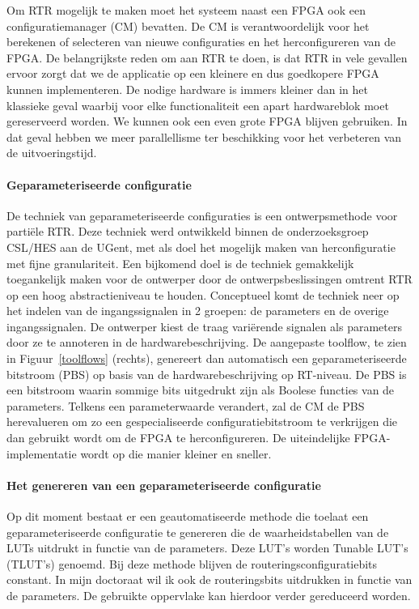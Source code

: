 \documentclass[a4paper,oneside,12pt]{article}
\begin{document}
Om RTR mogelijk te maken moet het systeem naast een FPGA ook een configuratiemanager (CM) bevatten. De CM is verantwoordelijk voor het berekenen of selecteren van nieuwe configuraties en het herconfigureren van de FPGA. De belangrijkste reden om aan RTR te doen, is dat RTR in vele gevallen ervoor zorgt dat we de applicatie op een kleinere en dus goedkopere FPGA kunnen implementeren. De nodige hardware is immers kleiner dan in het klassieke geval waarbij voor elke functionaliteit een apart hardwareblok moet gereserveerd worden. We kunnen ook een even grote FPGA blijven gebruiken. In dat geval hebben we meer parallellisme ter beschikking voor het verbeteren van de uitvoeringstijd.

\paragraph{Geparameteriseerde configuratie}
De techniek van geparameteriseerde configuraties is een ontwerpsmethode voor parti\"ele RTR. Deze techniek werd ontwikkeld binnen de onderzoeksgroep CSL/HES aan de UGent, met als doel het mogelijk maken van herconfiguratie met fijne granulariteit. Een bijkomend doel  is de techniek gemakkelijk toegankelijk maken voor de ontwerper door de ontwerpsbeslissingen omtrent RTR op een hoog abstractieniveau te houden. Conceptueel komt de techniek neer op het indelen van de ingangssignalen in 2 groepen: de parameters en de overige ingangssignalen. De ontwerper kiest de traag vari\"erende signalen als parameters door ze te annoteren in de hardwarebeschrijving. De aangepaste toolflow, te zien in Figuur~\ref{toolflows} (rechts), genereert dan automatisch een geparameteriseerde bitstroom (PBS) op basis van de hardwarebeschrijving op RT-niveau. De PBS is een bitstroom waarin sommige bits uitgedrukt zijn als Boolese functies van de parameters. Telkens een parameterwaarde verandert, zal de CM de PBS herevalueren om zo een gespecialiseerde configuratiebitstroom te verkrijgen die dan gebruikt wordt om de FPGA te herconfigureren. De uiteindelijke FPGA-implementatie wordt op die manier kleiner en sneller.

\paragraph{Het genereren van een geparameteriseerde configuratie}

Op dit moment bestaat er een geautomatiseerde methode die toelaat een geparameteriseerde configuratie te genereren die de waarheidstabellen van de LUTs uitdrukt in functie van de parameters. Deze LUT's worden Tunable LUT's (TLUT's) genoemd. Bij deze methode blijven de routeringsconfiguratiebits constant. In mijn doctoraat wil ik ook de routeringsbits uitdrukken in functie van de parameters. De gebruikte oppervlake kan hierdoor verder gereduceerd worden.
\end{document}
